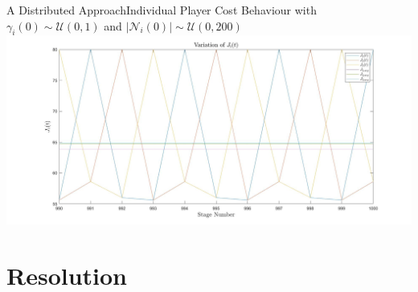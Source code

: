 \documentclass[aspectratio=169]{beamer}
\begin{document}
\begin{frame}{A Distributed Approach}{Individual Player Cost Behaviour with $\gamma_i(0) \sim \mathcal{U}(0,1)$ and $|\mathcal{N}_i(0)| \sim \mathcal{U}(0,200)$}
\includegraphics[width=\linewidth]{images/results_distributed_player_cost.jpg}
\end{frame}


\section{Resolution}
\end{document}
